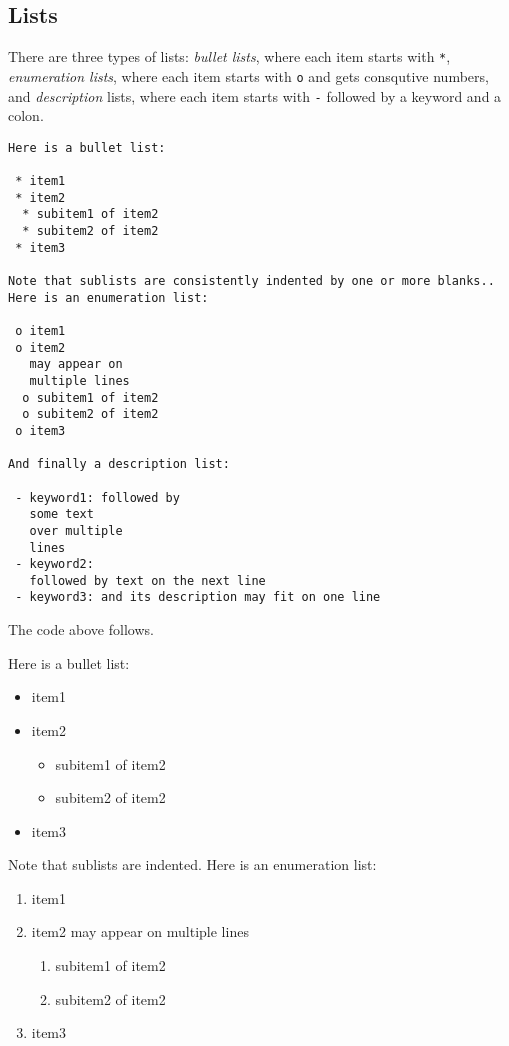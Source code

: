 \documentclass[twoside]{article}
\begin{document}
\subsection{Lists}

There are three types of lists: \emph{bullet lists}, where each item starts
with {\fontsize{10pt}{10pt}\verb!*!}, \emph{enumeration lists}, where each item starts with {\fontsize{10pt}{10pt}\verb!o!} and gets
consqutive numbers,
and \emph{description} lists, where each item starts with {\fontsize{10pt}{10pt}\verb!-!} followed
by a keyword and a colon.
\begin{Verbatim}
Here is a bullet list:

 * item1
 * item2
  * subitem1 of item2
  * subitem2 of item2
 * item3

Note that sublists are consistently indented by one or more blanks..
Here is an enumeration list:

 o item1
 o item2
   may appear on
   multiple lines
  o subitem1 of item2
  o subitem2 of item2
 o item3

And finally a description list:

 - keyword1: followed by
   some text
   over multiple
   lines
 - keyword2:
   followed by text on the next line
 - keyword3: and its description may fit on one line
\end{Verbatim}
The code above follows.

Here is a bullet list:

\begin{itemize}
 \item item1

 \item item2
\begin{itemize}

  \item subitem1 of item2

  \item subitem2 of item2

\end{itemize}

\noindent
 \item item3
\end{itemize}

\noindent
Note that sublists are indented.
Here is an enumeration list:

\begin{enumerate}
\item item1

\item item2
   may appear on
   multiple lines
\begin{enumerate}

 \item subitem1 of item2

 \item subitem2 of item2

\end{enumerate}

\noindent
\item item3
\end{enumerate}
\end{document}
